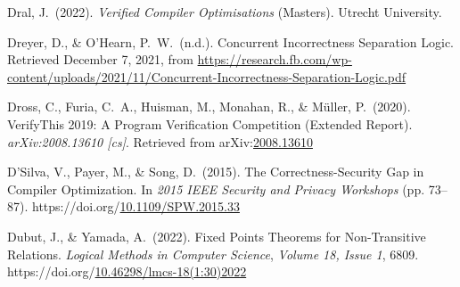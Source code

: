 \documentclass[12pt,twoside]{article}
\begin{document}
{\begin{thebibliography}{1079}
\mdbibitemlabel{}Dral, J.~(2022). \emph{Verified Compiler Optimisations} (Masters). Utrecht University.%

\mdbibitemlabel{}Dreyer, D., \& O’Hearn, P.~W.~(n.d.). Concurrent Incorrectness Separation Logic. Retrieved December 7, 2021, from \href{https://research.fb.com/wp-content/uploads/2021/11/Concurrent-Incorrectness-Separation-Logic.pdf}{{\ttfamily https://\hspace{0pt}research.\hspace{0pt}fb.\hspace{0pt}com/\hspace{0pt}wp-\hspace{0pt}content/\hspace{0pt}uploads/\hspace{0pt}2021/\hspace{0pt}11/\hspace{0pt}Concurrent-\hspace{0pt}Incorrectness-\hspace{0pt}Separation-\hspace{0pt}Logic.\hspace{0pt}pdf}}%

\mdbibitemlabel{}Dross, C., Furia, C.~A., Huisman, M., Monahan, R., \& Müller, P.~(2020). VerifyThis 2019: A Program Verification Competition (Extended Report). \emph{arXiv:2008.13610 {}[cs]}. Retrieved from arXiv:\href{http://arxiv.org/abs/2008.13610}{2008.13610}%

\mdbibitemlabel{}D’Silva, V., Payer, M., \& Song, D.~(2015). The Correctness-Security Gap in Compiler Optimization. In \emph{2015 IEEE Security and Privacy Workshops} (pp. 73–87). https://doi.org/\href{https://dx.doi.org/10.1109/SPW.2015.33}{10.1109/SPW.2015.33}%

\mdbibitemlabel{}Dubut, J., \& Yamada, A.~(2022). Fixed Points Theorems for Non-Transitive Relations. \emph{Logical Methods in Computer Science}, \emph{Volume 18, Issue 1}, 6809. https://doi.org/\href{https://dx.doi.org/10.46298/lmcs-18\%25281:30\%25292022}{10.46298/lmcs-18(1:30)2022}%


\end{thebibliography}}
\end{document}
